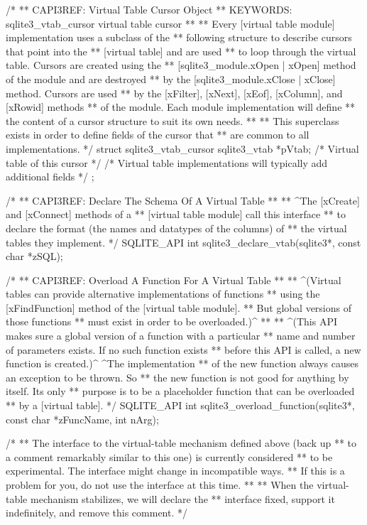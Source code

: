 \begin{Codex}[label=sqlite3.h,numbers=left]
{/*
** CAPI3REF: Virtual Table Cursor Object
** KEYWORDS: sqlite3_vtab_cursor {virtual table cursor}
**
** Every [virtual table module] implementation uses a subclass of the
** following structure to describe cursors that point into the
** [virtual table] and are used
** to loop through the virtual table.  Cursors are created using the
** [sqlite3_module.xOpen | xOpen] method of the module and are destroyed
** by the [sqlite3_module.xClose | xClose] method.  Cursors are used
** by the [xFilter], [xNext], [xEof], [xColumn], and [xRowid] methods
** of the module.  Each module implementation will define
** the content of a cursor structure to suit its own needs.
**
** This superclass exists in order to define fields of the cursor that
** are common to all implementations.
*/
struct sqlite3_vtab_cursor {
  sqlite3_vtab *pVtab;      /* Virtual table of this cursor */
  /* Virtual table implementations will typically add additional fields */
};

/*
** CAPI3REF: Declare The Schema Of A Virtual Table
**
** ^The [xCreate] and [xConnect] methods of a
** [virtual table module] call this interface
** to declare the format (the names and datatypes of the columns) of
** the virtual tables they implement.
*/
SQLITE_API int sqlite3_declare_vtab(sqlite3*, const char *zSQL);

/*
** CAPI3REF: Overload A Function For A Virtual Table
**
** ^(Virtual tables can provide alternative implementations of functions
** using the [xFindFunction] method of the [virtual table module].  
** But global versions of those functions
** must exist in order to be overloaded.)^
**
** ^(This API makes sure a global version of a function with a particular
** name and number of parameters exists.  If no such function exists
** before this API is called, a new function is created.)^  ^The implementation
** of the new function always causes an exception to be thrown.  So
** the new function is not good for anything by itself.  Its only
** purpose is to be a placeholder function that can be overloaded
** by a [virtual table].
*/
SQLITE_API int sqlite3_overload_function(sqlite3*, const char *zFuncName, int nArg);

/*
** The interface to the virtual-table mechanism defined above (back up
** to a comment remarkably similar to this one) is currently considered
** to be experimental.  The interface might change in incompatible ways.
** If this is a problem for you, do not use the interface at this time.
**
** When the virtual-table mechanism stabilizes, we will declare the
** interface fixed, support it indefinitely, and remove this comment.
*/

}
\end{Codex}
